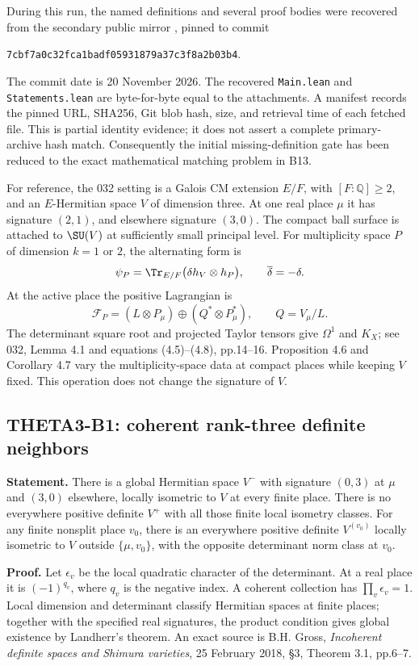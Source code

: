 \documentclass[11pt]{article}
\newcommand{\Q}{\mathbb Q}\newcommand{\C}{\mathbb C}\newcommand{\Z}{\mathbb Z}\newcommand{\R}{\mathbb R}\newcommand{\A}{\mathbb A}\newcommand{\OO}{\mathcal O}
\theoremstyle{definition}\newtheorem{definition}[theorem]{Definition}\newtheorem{remark}[theorem]{Remark}
\begin{document}
During this run, the named definitions and several proof bodies were recovered from the secondary public mirror , pinned to commit
\begin{center}\small\nolinkurl{7cbf7a0c32fca1badf05931879a37c3f8a2b03b4}.\end{center}
The commit date is 20 November 2026. The recovered \texttt{Main.lean} and \texttt{Statements.lean} are byte-for-byte equal to the attachments. A manifest records the pinned URL, SHA256, Git blob hash, size, and retrieval time of each fetched file. This is partial identity evidence; it does not assert a complete primary-archive hash match. Consequently the initial missing-definition gate has been reduced to the exact mathematical matching problem in B13.

For reference, the 032 setting is a Galois CM extension $E/F$, with $[F:\Q]\geq2$, and an $E$-Hermitian space $V$ of dimension three. At one real place $\mu$ it has signature $(2,1)$, and elsewhere signature $(3,0)$. The compact ball surface is attached to $\SU(V)$ at sufficiently small principal level. For multiplicity space $P$ of dimension $k=1$ or $2$, the alternating form is
\[
 \psi_P=\Tr_{E/F}\bigl(\delta h_V\otimes h_P\bigr),
 \qquad \overline\delta=-\delta.
\]
At the active place the positive Lagrangian is
\[
 \mathcal F_P=(L\otimes P_\mu)\oplus(Q^*\otimes P_\mu^*),
 \qquad Q=V_\mu/L.
\]
The determinant square root and projected Taylor tensors give $\Omega^1$ and $K_X$; see 032, Lemma 4.1 and equations (4.5)--(4.8), pp.14--16. Proposition 4.6 and Corollary 4.7 vary the multiplicity-space data at compact places while keeping $V$ fixed. This operation does not change the signature of $V$.

\subsection{THETA3-B1: coherent rank-three definite neighbors}\label{B1}

\textbf{Statement.} There is a global Hermitian space $V^-$ with signature $(0,3)$ at $\mu$ and $(3,0)$ elsewhere, locally isometric to $V$ at every finite place. There is no everywhere positive definite $V^+$ with all those finite local isometry classes. For any finite nonsplit place $v_0$, there is an everywhere positive definite $V^{(v_0)}$ locally isometric to $V$ outside $\{\mu,v_0\}$, with the opposite determinant norm class at $v_0$.

\textbf{Proof.} Let $\epsilon_v$ be the local quadratic character of the determinant. At a real place it is $(-1)^{q_v}$, where $q_v$ is the negative index. A coherent collection has $\prod_v\epsilon_v=1$. Local dimension and determinant classify Hermitian spaces at finite places; together with the specified real signatures, the product condition gives global existence by Landherr's theorem. An exact source is B.H. Gross, \emph{Incoherent definite spaces and Shimura varieties}, 25 February 2018, \S3, Theorem 3.1, pp.6--7.
\end{document}

